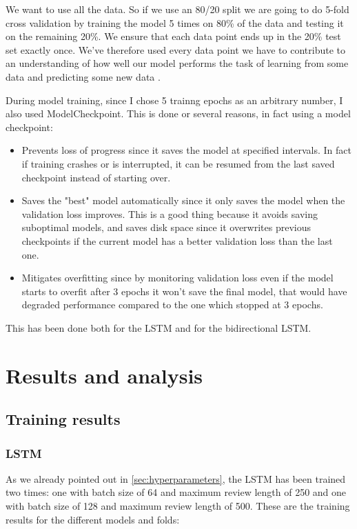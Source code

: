\documentclass{article}
\begin{document}
We want to use all the data.
So if we use an 80/20 split we are going to do 5-fold cross validation by training the model 5 times on 80\% of the data and testing it on the remaining 20\%.
We ensure that each data point ends up in the 20\% test set exactly once.
We've therefore used every data point we have to contribute to an understanding of how well our model performs the task of learning from some data and predicting some new data \cite{stackexchangeChoosePredictive}.

During model training, since I chose 5 trainng epochs as an arbitrary number, I also used ModelCheckpoint.
This is done or several reasons, in fact using a model checkpoint:
\begin{itemize}
  \item Prevents loss of progress since it saves the model at specified intervals. In fact if training crashes or is interrupted, it can be resumed from the last saved checkpoint instead of starting over.
  \item Saves the "best" model automatically since it only saves the model when the validation loss improves. This is a good thing because it avoids saving suboptimal models, and saves disk space since it overwrites previous checkpoints if the current model has a better validation loss than the last one.
  \item Mitigates overfitting since by monitoring validation loss even if the model starts to overfit after 3 epochs it won't save the final model, that would have degraded performance compared to the one which stopped at 3 epochs.
\end{itemize}

This has been done both for the LSTM and for the bidirectional LSTM.

\section{Results and analysis}

\subsection{Training results}

\subsubsection{LSTM}

As we already pointed out in \ref{sec:hyperparameters}, the LSTM has been trained two times: one with batch size of 64 and maximum review length of 250 and one with batch size of 128 and maximum review length of 500.
These are the training results for the different models and folds:
\end{document}
